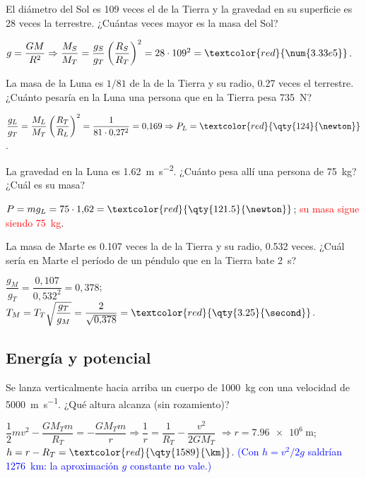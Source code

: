 \begin{exercise}
    El diámetro del Sol es 109 veces el de la Tierra y la gravedad en su superficie es 28 veces la terrestre. ¿Cuántas veces
    mayor es la masa del Sol?
    \begin{solu}
        \(g = \dfrac{GM}{R^2} \Rightarrow \dfrac{M_S}{M_T} = \dfrac{g_S}{g_T}\left(\dfrac{R_S}{R_T}\right)^2 = 28\cdot 109^2 = \textcolor{red}{\num{3.33e5}}\).
    \end{solu}
\end{exercise}

\begin{exercise}
    La masa de la Luna es \(1/81\) de la de la Tierra y su radio, \num{0.27} veces el terrestre. ¿Cuánto pesaría en la Luna una
    persona que en la Tierra pesa \qty{735}{\newton}?
    \begin{solu}
        \(\dfrac{g_L}{g_T} = \dfrac{M_L}{M_T}\left(\dfrac{R_T}{R_L}\right)^2 = \dfrac{1}{81\cdot 0{,}27^2} = 0{,}169 \Rightarrow P_L = \textcolor{red}{\qty{124}{\newton}}\).
    \end{solu}
\end{exercise}

\begin{exercise}
    La gravedad en la Luna es \qty{1.62}{\m\per\second\squared}. ¿Cuánto pesa allí una persona de \qty{75}{\kg}? ¿Cuál es su masa?
    \begin{solu}
        \(P = m g_L = 75\cdot 1{,}62 = \textcolor{red}{\qty{121.5}{\newton}}\); \textcolor{red}{su masa sigue siendo \qty{75}{\kg}}.
    \end{solu}
\end{exercise}

\begin{exercise}
    La masa de Marte es \num{0.107} veces la de la Tierra y su radio, \num{0.532} veces. ¿Cuál sería en Marte el período de un
    péndulo que en la Tierra bate \qty{2}{\second}?
    \begin{solu}
        \(\dfrac{g_M}{g_T} = \dfrac{0{,}107}{0{,}532^2} = 0{,}378\);
        \(T_M = T_T\sqrt{\dfrac{g_T}{g_M}} = \dfrac{2}{\sqrt{0{,}378}} = \textcolor{red}{\qty{3.25}{\second}}\).
    \end{solu}
\end{exercise}

\subsection{Energía y potencial}

\begin{exercise}
    Se lanza verticalmente hacia arriba un cuerpo de \qty{1000}{\kg} con una velocidad de \qty{5000}{\m\per\second}. ¿Qué altura
    alcanza (sin rozamiento)?
    \begin{solu}
        \(\dfrac{1}{2}m v^2 - \dfrac{G M_T m}{R_T} = -\dfrac{G M_T m}{r} \Rightarrow \dfrac{1}{r} = \dfrac{1}{R_T} - \dfrac{v^2}{2 G M_T}\)
        \(\Rightarrow r = \qty{7.96e6}{\m}\); \(h = r - R_T = \textcolor{red}{\qty{1589}{\km}}\).
        \textcolor{blue}{(Con \(h = v^2/2g\) saldrían \qty{1276}{\km}: la aproximación \(g\) constante no vale.)}
    \end{solu}
\end{exercise}

